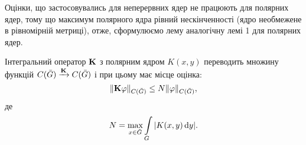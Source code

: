 Оцінки, що застосовувались для неперервних ядер не працюють для полярних ядер, тому що максимум полярного ядра рівний нескінченності (ядро необмежене в рівномірній метриці), отже, сформулюємо лему аналогічну лемі 1 для полярних ядер. 
\begin{lemma}
	Інтегральний оператор $\bf{K}$ з полярним ядром $K(x, y)$ переводить множину функцій $C(\bar G) \xrightarrow{\bf{K}} C (\bar G)$ і при цьому має місце оцінка: 
	\begin{equation}
		\label{eq:1.21}
		\| \bf{K} \phi \|_{C(\bar G)} \le N \| \phi\|_{C(\bar G)},
	\end{equation}
	де 
	\begin{equation}
		\label{eq:1.22}
		N = \Max_{x \in \bar G} \Int_G |K(x, y) \diff y|.
	\end{equation}
\end{lemma}

